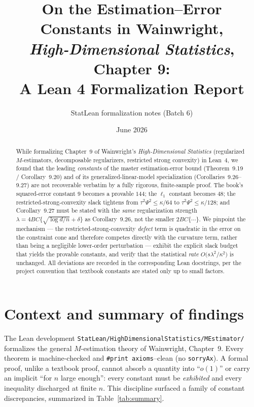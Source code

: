 \documentclass[11pt]{article}
\title{\bf On the Estimation--Error Constants in Wainwright,\\
\emph{High-Dimensional Statistics}, Chapter 9:\\[2pt]
\large A Lean 4 Formalization Report}
\author{StatLean formalization notes (Batch 6)}
\date{June 2026}
\theoremstyle{definition}
\begin{document}
\maketitle

\begin{abstract}
While formalizing Chapter~9 of Wainwright's \emph{High-Dimensional Statistics} (regularized
$M$-estimators, decomposable regularizers, restricted strong convexity) in Lean~4, we found that
the leading \emph{constants} of the master estimation-error bound (Theorem~9.19 / Corollary~9.20)
and of its generalized-linear-model specialization (Corollaries~9.26--9.27) are not recoverable
verbatim by a fully rigorous, finite-sample proof. The book's squared-error constant $9$ becomes a
provable $144$; the $\ell_1$ constant becomes $48$; the restricted-strong-convexity slack tightens
from $\tau^2\Psi^2\le\kappa/64$ to $\tau^2\Psi^2\le\kappa/128$; and Corollary~9.27 must be stated with
the \emph{same} regularization strength $\lambda=4BC\{\sqrt{\log d/n}+\delta\}$ as Corollary~9.26,
not the smaller $2BC\{\cdots\}$. We pinpoint the mechanism --- the restricted-strong-convexity
\emph{defect} term is quadratic in the error on the constraint cone and therefore competes directly
with the curvature term, rather than being a negligible lower-order perturbation --- exhibit the
explicit slack budget that yields the provable constants, and verify that the statistical
\emph{rate} $O\!\big(s\lambda^2/\kappa^2\big)$ is unchanged. All deviations are recorded in the
corresponding Lean docstrings, per the project convention that textbook constants are stated only up
to small factors.
\end{abstract}

\section{Context and summary of findings}

The Lean development \texttt{StatLean/HighDimensionalStatistics/MEstimator/} formalizes the general
$M$-estimation theory of Wainwright, Chapter~9. Every theorem is machine-checked and
\texttt{\#print axioms}--clean (no \texttt{sorryAx}). A formal proof, unlike a textbook proof, cannot
absorb a quantity into ``$o(1)$'' or carry an implicit ``for $n$ large enough'': every constant must be
\emph{exhibited} and every inequality discharged at finite $n$. This discipline surfaced a family of
constant discrepancies, summarized in Table~\ref{tab:summary}.
\end{document}
